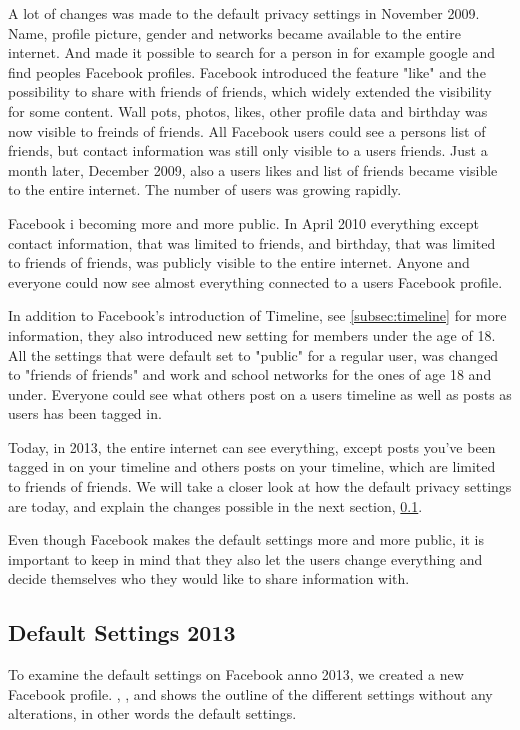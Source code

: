 A lot of changes was made to the default privacy settings in November 2009. Name, profile picture, gender and networks became available to the entire internet. And made it possible to search for a person in for example google and find peoples Facebook profiles. Facebook introduced the feature "like" and the possibility to share with friends of friends, which widely extended the visibility for some content. Wall pots, photos, likes, other profile data and birthday was now visible to freinds of friends. All Facebook users could see a persons list of friends, but contact information was still only visible to a users friends. Just a month later, December 2009, also a users likes and list of friends became visible to the entire internet. The number of users was growing rapidly.

Facebook i becoming more and more public. In April 2010 everything except contact information, that was limited to friends, and birthday, that was limited to friends of friends, was publicly visible to the entire internet. Anyone and everyone could now see almost everything connected to a users Facebook profile. 

In addition to Facebook's introduction of Timeline, see \ref{subsec:timeline} for more information, they also introduced new setting for members under the age of 18. All the settings that were default set to "public" for a regular user, was changed to "friends of friends" and work and school networks for the ones of age 18 and under. Everyone could see what others post on a users timeline as well as posts as users has been tagged in.

Today, in 2013, the entire internet can see everything,  except posts you've been tagged in on your timeline and others posts on your timeline, which are limited to friends of friends. We will take a closer look at how the default privacy settings are today, and explain the changes possible in the next section, \ref{subsec:default2013}. 

Even though Facebook makes the default settings more and more public, it is important to keep in mind that they also let the users change everything and decide themselves who they would like to share information with.   


\subsection{Default Settings 2013}
\label{subsec:default2013}

To examine the default settings on Facebook anno 2013, we created a new Facebook profile. , ,  and  shows the outline of the different settings without any alterations, in other words the default settings. 

